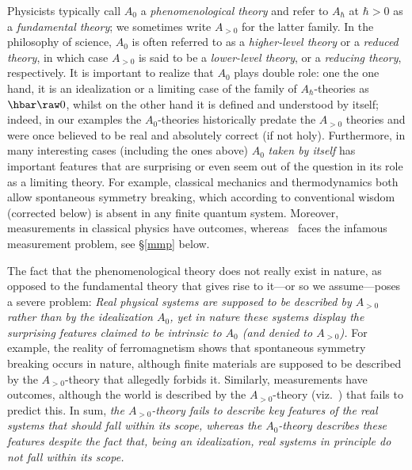 \documentclass[12pt]{article}
\begin{document}
Physicists typically call $A_0$ a \emph{phenomenological theory} and refer to $A_{\hbar}$ at $\hbar>0$ 
as a  \emph{fundamental theory}; we sometimes write $A_{>0}$ for the latter family. 
In the philosophy of science, $A_0$ is often referred to as a \emph{higher-level theory} or a   \emph{reduced theory}, in which case  $A_{>0}$   is said to be a
 \emph{lower-level theory},  or a \emph{reducing theory}, respectively. 
 It is important to realize that $A_0$ plays double role: one the one hand, it is
 an idealization or a limiting case of the family of $A_{\hbar}$-theories as $\hbar\raw 0$, whilst on the other 
hand it is defined and understood by itself; indeed, in our examples the $A_0$-theories historically predate the 
$A_{>0}$ theories and were once believed to be real and absolutely correct (if not holy).  Furthermore, in many interesting cases (including the ones above) $A_0$
 \emph{taken by itself} has important features that are surprising or even seem out of the question in its role as a limiting theory. For example, 
 classical mechanics and  thermodynamics both allow spontaneous symmetry breaking, which according to conventional wisdom (corrected below) is absent in any finite quantum system. Moreover, measurements in classical physics  have outcomes, whereas \qm\ faces the infamous measurement problem, see \S\ref{mmp} below.
 
The fact that the phenomenological theory does not really exist in nature, as opposed to the fundamental theory that gives rise to it---or so we assume---poses a severe problem: \emph{Real physical systems are supposed to be described by $A_{>0}$
rather than by the idealization $A_0$, yet in nature these systems display the surprising  features claimed to be intrinsic to $A_0$ (and denied to $A_{>0}$).} For example, the reality of ferromagnetism shows that spontaneous symmetry breaking occurs in nature, although finite materials are supposed to be described by the $A_{>0}$-theory that allegedly forbids it. 
Similarly,  measurements have outcomes, although the world is described by the $A_{>0}$-theory (viz.\ \qm) that fails to predict this. In sum, \emph{the $A_{>0}$-theory fails to describe key features of the real systems that should fall within its scope, whereas the $A_0$-theory  describes these features despite the fact that, being an idealization, real systems in principle do not fall within its scope. }
\end{document}
